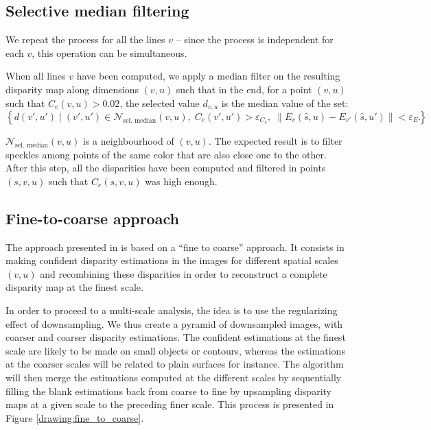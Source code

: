 \documentclass{article}
\newcommand{\norm}[1]{\left\lVert#1\right\rVert}
\theoremstyle{definition}
\begin{document}
\subsection{Selective median filtering}


We repeat the process for all the lines $v$ -- since the process is independent for each $v$, this operation can be simultaneous.


When all lines $v$ have been computed, we apply a median filter on the resulting disparity map along dimensions $(v, u)$ such that in the end, for a point $(v, u)$ such that $C_e (v, u) > 0.02$, the selected value $d_{v, u}$ is the median value of the set:
\[ \left\{ d (v', u') \; | \; (v', u') \in \mathcal{N}_\text{sel. median}(v, u), \; C_e(v', u') > \varepsilon_{C_e}, \; \norm{E_{v}(\widehat{s}, u) - E_{v'}(\widehat{s}, u')} < \varepsilon_{E} \right\}.\]

$\mathcal{N}_\text{sel. median}(v, u)$ is a neighbourhood of $(v, u)$. The expected result is to filter speckles among points of the same color that are also close one to the other. After this step, all the disparities have been computed and filtered in points $(s, v, u)$ such that $C_e(s, v, u)$ was high enough.


\subsection{Fine-to-coarse approach}


The approach presented in \cite{art:kim13:lfields} is based on a ``fine to coarse'' approach. It consists in making confident disparity estimations in the images for different spatial scales $(v, u)$ and recombining these disparities in order to reconstruct a complete disparity map at the finest scale.


In order to proceed to a multi-scale analysis, the idea is to use the regularizing effect of downsampling. We thus create a pyramid of downsampled images, with coarser and coarser disparity estimations. The confident estimations at the finest scale are likely to be made on small objects or contours, whereas the estimations at the coarser scales will be related to plain surfaces for instance. The algorithm will then merge the estimations computed at the different scales by sequentially filling the blank estimations back from coarse to fine by upsampling disparity maps at a given scale to the preceding finer scale. This process is presented in Figure \ref{drawing:fine_to_coarse}.
\end{document}
